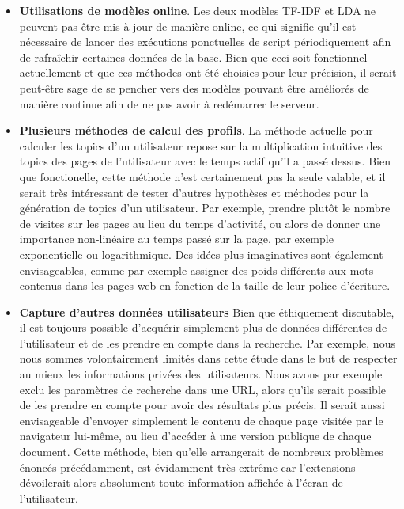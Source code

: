 \begin{itemize}
		\item \textbf{Utilisations de modèles online}. Les deux modèles TF-IDF et LDA ne peuvent pas être mis à jour de manière online, ce qui signifie qu'il est nécessaire de lancer des exécutions ponctuelles de script périodiquement afin de rafraîchir certaines données de la base. Bien que ceci soit fonctionnel actuellement et que ces méthodes ont été choisies pour leur précision, il serait peut-être sage de se pencher vers des modèles pouvant être améliorés de manière continue afin de ne pas avoir à redémarrer le serveur.
		\item \textbf{Plusieurs méthodes de calcul des profils}. La méthode actuelle pour calculer les topics d'un utilisateur repose sur la multiplication intuitive des topics des pages de l'utilisateur avec le temps actif qu'il a passé dessus. Bien que fonctionelle, cette méthode n'est certainement pas la seule valable, et il serait très intéressant de tester d'autres hypothèses et méthodes pour la génération de topics d'un utilisateur. Par exemple, prendre plutôt le nombre de visites sur les pages au lieu du temps d'activité, ou alors de donner une importance non-linéaire au temps passé sur la page, par exemple exponentielle ou logarithmique. Des idées plus imaginatives sont également envisageables, comme par exemple assigner des poids différents aux mots contenus dans les pages web en fonction de la taille de leur police d'écriture.
		\item \textbf{Capture d'autres données utilisateurs} Bien que éthiquement discutable, il est toujours possible d'acquérir simplement plus de données différentes de l'utilisateur et de les prendre en compte dans la recherche. Par exemple, nous nous sommes volontairement limités dans cette étude dans le but de respecter au mieux les informations privées des utilisateurs. Nous avons par exemple exclu les paramètres de recherche dans une URL, alors qu'ils serait possible de les prendre en compte pour avoir des résultats plus précis. Il serait aussi envisageable d'envoyer simplement le contenu de chaque page visitée par le navigateur lui-même, au lieu d'accéder à une version publique de chaque document. Cette méthode, bien qu'elle arrangerait de nombreux problèmes énoncés précédamment, est évidamment très extrême car l'extensions dévoilerait alors absolument toute information affichée à l'écran de l'utilisateur.
	\end{itemize}


